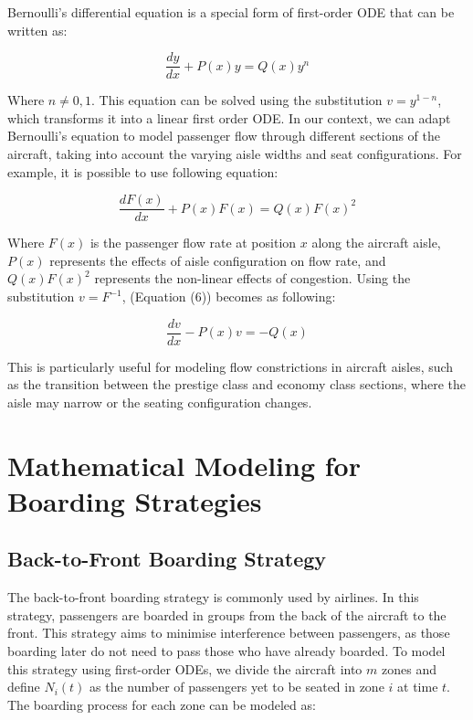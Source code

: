 \documentclass[12pt]{article}
\begin{document}
Bernoulli's differential equation is a special form of first-order ODE that can be written as:

\begin{equation}
\frac{dy}{dx} + P(x)y = Q(x)y^n
\end{equation}

Where $n \neq 0, 1$. This equation can be solved using the substitution $v = y^{1-n}$, which transforms it into a linear first order ODE. In our context, we can adapt Bernoulli's equation to model passenger flow through different sections of the aircraft, taking into account the varying aisle widths and seat configurations. For example, it is possible to use following equation:

\begin{equation}
\frac{dF(x)}{dx} + P(x)F(x) = Q(x)F(x)^2
\end{equation}

Where $F(x)$ is the passenger flow rate at position $x$ along the aircraft aisle, $P(x)$ represents the effects of aisle configuration on flow rate, and $Q(x)F(x)^2$ represents the non-linear effects of congestion. Using the substitution $v = F^{-1}$, (Equation (6)) becomes as following:

\begin{equation}
\frac{dv}{dx} - P(x)v = -Q(x)
\end{equation}

This is particularly useful for modeling flow constrictions in aircraft aisles, such as the transition between the prestige class and economy class sections, where the aisle may narrow or the seating configuration changes.

\section{Mathematical Modeling for Boarding Strategies}
\subsection{Back-to-Front Boarding Strategy}

The back-to-front boarding strategy is commonly used by airlines. In this strategy, passengers are boarded in groups from the back of the aircraft to the front. This strategy aims to minimise interference between passengers, as those boarding later do not need to pass those who have already boarded. To model this strategy using first-order ODEs, we divide the aircraft into $m$ zones and define $N_i(t)$ as the number of passengers yet to be seated in zone $i$ at time $t$. The boarding process for each zone can be modeled as:
\end{document}
